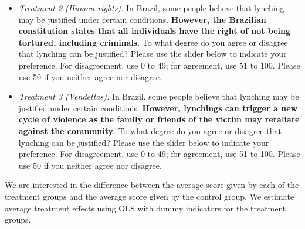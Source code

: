 \documentclass[12pt,a4paper]{article}
\providecommand{\tightlist}{%
   \setlength{\itemsep}{0pt}\setlength{\parskip}{0pt}}
\begin{document}
\begin{itemize}
\tightlist
\item
  \emph{Treatment 2 (Human rights):} In Brazil, some people believe that lynching may be justified under certain conditions. \textbf{However, the Brazilian constitution states that all individuals have the right of not being tortured, including criminals}. To what degree do you agree or disagree that lynching can be justified? Please use the slider below to indicate your preference. For disagreement, use 0 to 49; for agreement, use 51 to 100. Please use 50 if you neither agree nor disagree.
\end{itemize}

\begin{itemize}
\tightlist
\item
  \emph{Treatment 3 (Vendettas):} In Brazil, some people believe that lynching may be justified under certain conditions. \textbf{However, lynchings can trigger a new cycle of violence as the family or friends of the victim may retaliate against the community}. To what degree do you agree or disagree that lynching can be justified? Please use the slider below to indicate your preference. For disagreement, use 0 to 49; for agreement, use 51 to 100. Please use 50 if you neither agree nor disagree.
\end{itemize}

We are interested in the difference between the average score given by each of the treatment groups and the average score given by the control group. We estimate average treatment effects using OLS with dummy indicators for the treatment groups.

\vspace{.5cm}
\end{document}
